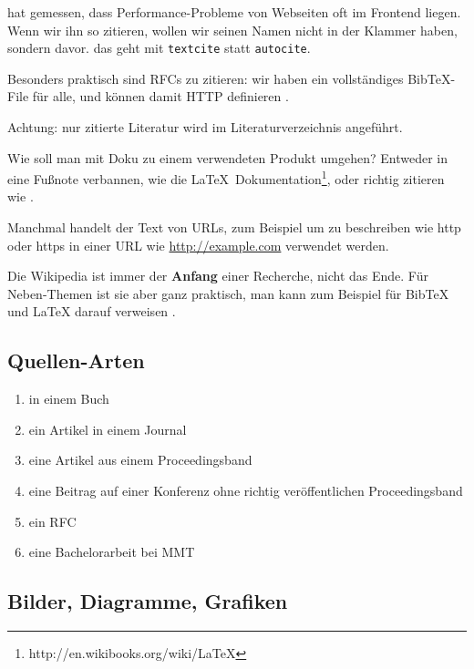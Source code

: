 \textcite{Souders:2007} hat gemessen, dass Performance-Probleme von Webseiten oft im Frontend liegen.
Wenn wir ihn so zitieren, wollen wir seinen Namen nicht in der Klammer haben, sondern davor. das geht
mit \texttt{textcite} statt \texttt{autocite}.

Besonders praktisch sind RFCs zu zitieren: wir haben ein vollständiges
BibTeX-File für alle, und können damit HTTP definieren \autocite{rfc1945}.

Achtung: nur zitierte Literatur wird im Literaturverzeichnis angeführt.

Wie soll man mit Doku zu einem verwendeten Produkt umgehen?
Entweder in eine Fußnote verbannen, wie die \LaTeX\ Dokumentation\footnote{http://en.wikibooks.org/wiki/LaTeX},
oder richtig zitieren wie \autocite[]{jQueryDoc}.

Manchmal handelt der Text von URLs, zum Beispiel um zu
beschreiben wie http oder https in einer URL wie 
\url{http://example.com} verwendet werden.

Die Wikipedia ist immer der \textbf{Anfang}  einer Recherche, 
nicht das Ende. Für Neben-Themen ist sie aber ganz praktisch, 
man kann zum Beispiel für BibTeX und LaTeX darauf verweisen \autocites[BibTeX]{wikipedia:bibtex}[LaTeX]{wikipedia:latex}.

\subsection{Quellen-Arten}

\begin{enumerate}
\item in einem Buch \autocite[580-605]{Tanenbaum:2003}
\item ein Artikel in einem Journal \autocite{Renaud:2004}
\item eine Artikel aus einem Proceedingsband \autocite{Bailey:1981}
\item eine Beitrag auf einer Konferenz ohne richtig veröffentlichen Proceedingsband \autocite{Yacoub:1998}
\item ein RFC \autocite{rfc1945}
\item eine Bachelorarbeit bei MMT \autocite{Schmidt:2011}
\end{enumerate}


\subsection{Bilder, Diagramme, Grafiken}

